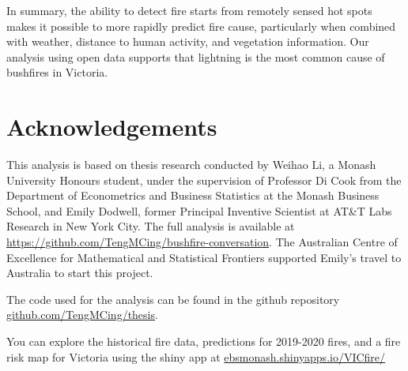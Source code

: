 \documentclass[
  11pt,
  a4paper,
]{article}
\begin{document}
In summary, the ability to detect fire starts from remotely sensed hot spots makes it possible to more rapidly predict fire cause, particularly when combined with weather, distance to human activity, and vegetation information. Our analysis using open data supports that lightning is the most common cause of bushfires in Victoria.

\hypertarget{acknowledgements}{%
\section{Acknowledgements}\label{acknowledgements}}

This analysis is based on thesis research conducted by Weihao Li, a Monash University Honours student, under the supervision of Professor Di Cook from the Department of Econometrics and Business Statistics at the Monash Business School, and Emily Dodwell, former Principal Inventive Scientist at AT\&T Labs Research in New York City. The full analysis is available at \url{https://github.com/TengMCing/bushfire-conversation}. The Australian Centre of Excellence for Mathematical and Statistical Frontiers supported Emily's travel to Australia to start this project.

The code used for the analysis can be found in the github repository \href{https://github.com/TengMCing/thesis}{github.com/TengMCing/thesis}.

You can explore the historical fire data, predictions for 2019-2020 fires, and a fire risk map for Victoria using the shiny app at \href{https://ebsmonash.shinyapps.io/VICfire/}{ebsmonash.shinyapps.io/VICfire/}

\printbibliography
\end{document}
